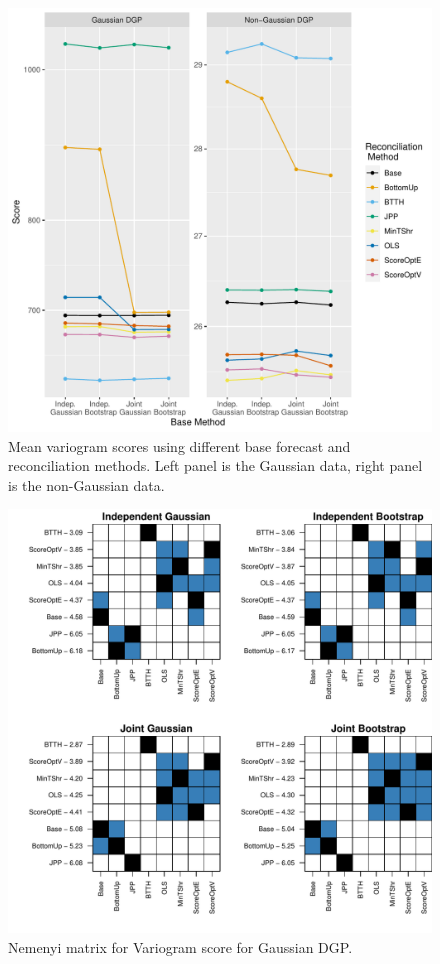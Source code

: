 \documentclass[a4paper,12pt]{article}
\theoremstyle{definition}
\begin{document}
\begin{figure}[!htb]
	\centering
	\includegraphics[width=0.45\textheight]{variogram_meanscore}
	\caption{Mean variogram scores using different base forecast and reconciliation methods. Left panel is the Gaussian data, right panel is the non-Gaussian data.}
	\label{fig:meanscore_v}
\end{figure}

\begin{figure}[!htb]
	\centering
	\includegraphics[height=.4\textheight]{gsv.pdf}
	\caption{Nemenyi matrix for Variogram score for Gaussian DGP.}
	\label{fig:gsv}
\end{figure}
\end{document}
